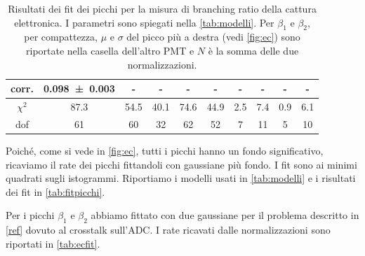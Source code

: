 \begin{table}
\begin{tabular}{c||ccccc|cc|cc}
		corr.       &   \num{0.098(3)} &                 - &                   - &                 - &                   - &                - &               - &                - &               - \\ \hline
		$\chi^2$    &             87.3 &              54.5 &                40.1 &              74.6 &                44.9 &              2.5 &             7.4 &              0.9 &             6.1 \\
		dof         &               61 &                60 &                  32 &                62 &                  52 &                7 &              11 &                5 &              10
	\end{tabular}
	\caption{\label{tab:fitpicchi}
	Risultati dei fit dei picchi per la misura di branching ratio della cattura elettronica.
	I parametri sono spiegati nella \autoref{tab:modelli}.
	Per $\beta_1$ e $\beta_2$, per compattezza,
	$\mu$ e $\sigma$ del picco più a destra
	(vedi \autoref{fig:ec})
	sono riportate nella casella dell'altro PMT
	e $N$ è la somma delle due normalizzazioni.}
\end{table}

Poiché, come si vede in \autoref{fig:ec},
tutti i picchi hanno un fondo significativo,
ricaviamo il rate dei picchi fittandoli con gaussiane più fondo.
I fit sono ai minimi quadrati sugli istogrammi.
Riportiamo i modelli usati in \autoref{tab:modelli}
e i risultati dei fit in \autoref{tab:fitpicchi}.


Per i picchi $\beta_1$ e $\beta_2$ abbiamo fittato con due gaussiane
per il problema descritto in \autoref{ref} dovuto al crosstalk sull'ADC.
I rate ricavati dalle normalizzazioni sono riportati in \autoref{tab:ecfit}.

